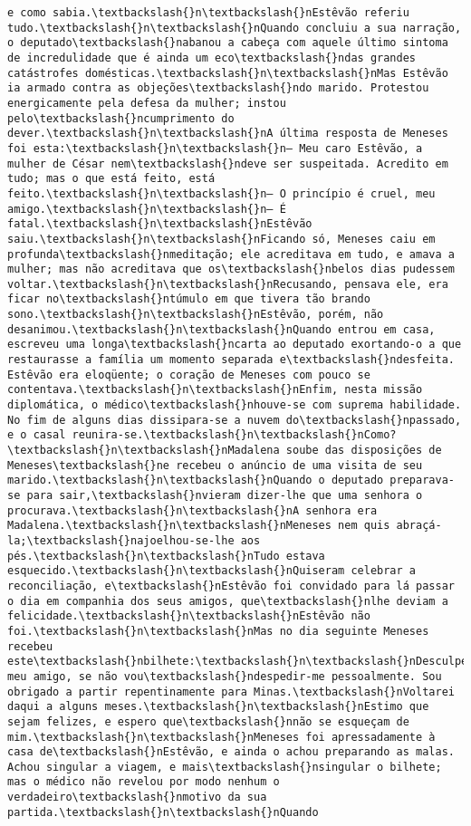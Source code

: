 \begin{Verbatim}[commandchars=\\\{\}]
e como sabia.\textbackslash{}n\textbackslash{}nEstêvão referiu tudo.\textbackslash{}n\textbackslash{}nQuando concluiu a sua narração, o deputado\textbackslash{}nabanou a cabeça com aquele último sintoma de incredulidade que é ainda um eco\textbackslash{}ndas grandes catástrofes domésticas.\textbackslash{}n\textbackslash{}nMas Estêvão ia armado contra as objeções\textbackslash{}ndo marido. Protestou energicamente pela defesa da mulher; instou pelo\textbackslash{}ncumprimento do dever.\textbackslash{}n\textbackslash{}nA última resposta de Meneses foi esta:\textbackslash{}n\textbackslash{}n— Meu caro Estêvão, a mulher de César nem\textbackslash{}ndeve ser suspeitada. Acredito em tudo; mas o que está feito, está feito.\textbackslash{}n\textbackslash{}n— O princípio é cruel, meu amigo.\textbackslash{}n\textbackslash{}n— É fatal.\textbackslash{}n\textbackslash{}nEstêvão saiu.\textbackslash{}n\textbackslash{}nFicando só, Meneses caiu em profunda\textbackslash{}nmeditação; ele acreditava em tudo, e amava a mulher; mas não acreditava que os\textbackslash{}nbelos dias pudessem voltar.\textbackslash{}n\textbackslash{}nRecusando, pensava ele, era ficar no\textbackslash{}ntúmulo em que tivera tão brando sono.\textbackslash{}n\textbackslash{}nEstêvão, porém, não desanimou.\textbackslash{}n\textbackslash{}nQuando entrou em casa, escreveu uma longa\textbackslash{}ncarta ao deputado exortando-o a que restaurasse a família um momento separada e\textbackslash{}ndesfeita. Estêvão era eloqüente; o coração de Meneses com pouco se contentava.\textbackslash{}n\textbackslash{}nEnfim, nesta missão diplomática, o médico\textbackslash{}nhouve-se com suprema habilidade. No fim de alguns dias dissipara-se a nuvem do\textbackslash{}npassado, e o casal reunira-se.\textbackslash{}n\textbackslash{}nComo?\textbackslash{}n\textbackslash{}nMadalena soube das disposições de Meneses\textbackslash{}ne recebeu o anúncio de uma visita de seu marido.\textbackslash{}n\textbackslash{}nQuando o deputado preparava-se para sair,\textbackslash{}nvieram dizer-lhe que uma senhora o procurava.\textbackslash{}n\textbackslash{}nA senhora era Madalena.\textbackslash{}n\textbackslash{}nMeneses nem quis abraçá-la;\textbackslash{}najoelhou-se-lhe aos pés.\textbackslash{}n\textbackslash{}nTudo estava esquecido.\textbackslash{}n\textbackslash{}nQuiseram celebrar a reconciliação, e\textbackslash{}nEstêvão foi convidado para lá passar o dia em companhia dos seus amigos, que\textbackslash{}nlhe deviam a felicidade.\textbackslash{}n\textbackslash{}nEstêvão não foi.\textbackslash{}n\textbackslash{}nMas no dia seguinte Meneses recebeu este\textbackslash{}nbilhete:\textbackslash{}n\textbackslash{}nDesculpe, meu amigo, se não vou\textbackslash{}ndespedir-me pessoalmente. Sou obrigado a partir repentinamente para Minas.\textbackslash{}nVoltarei daqui a alguns meses.\textbackslash{}n\textbackslash{}nEstimo que sejam felizes, e espero que\textbackslash{}nnão se esqueçam de mim.\textbackslash{}n\textbackslash{}nMeneses foi apressadamente à casa de\textbackslash{}nEstêvão, e ainda o achou preparando as malas. Achou singular a viagem, e mais\textbackslash{}nsingular o bilhete; mas o médico não revelou por modo nenhum o verdadeiro\textbackslash{}nmotivo da sua partida.\textbackslash{}n\textbackslash{}nQuando 
\end{Verbatim}
